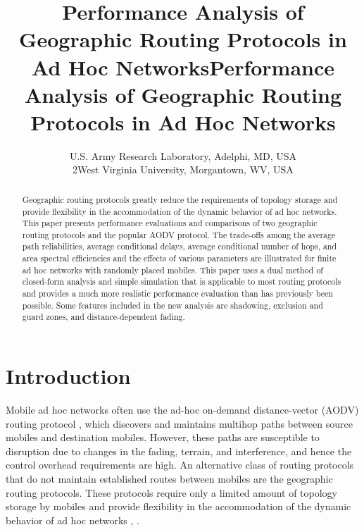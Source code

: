 \documentclass[conference]{IEEEtran}
\begin{document}
\title{Performance Analysis of Geographic Routing Protocols in Ad Hoc Networks}


\title
{Performance Analysis of Geographic Routing Protocols in Ad Hoc Networks}
\author{ \IEEEauthorblockA
{U.S. Army Research Laboratory, Adelphi, MD, USA \\ \IEEEauthorrefmark
{2}West Virginia University, Morgantown, WV, USA} }
\maketitle

\begin{abstract}

Geographic routing protocols greatly reduce
the requirements of topology storage and provide flexibility
in the accommodation of the dynamic behavior of ad hoc
networks. This paper presents performance evaluations and
comparisons of two geographic routing protocols and the
popular AODV protocol. The trade-offs among the average
path reliabilities, average conditional delays, average conditional number of hops, and area spectral efficiencies and the
effects of various parameters are illustrated for finite ad hoc
networks with randomly placed mobiles. This paper uses a
dual method of closed-form analysis and simple simulation
that is applicable to most routing protocols and provides
a much more realistic performance evaluation than has
previously been possible. Some features included in the
new analysis are shadowing, exclusion and guard zones,
and distance-dependent fading.

\end{abstract}

\section{Introduction}

Mobile ad hoc networks often use the ad-hoc on-demand distance-vector (AODV)
routing protocol \cite{perk}, which discovers and maintains multihop paths
between source mobiles and destination mobiles. However, these paths are
susceptible to disruption due to changes in the fading, terrain, and
interference, and hence the control overhead requirements are high. An
alternative class of routing protocols that do not maintain established routes
between mobiles are the geographic routing protocols. These protocols require
only a limited amount of topology storage by mobiles and provide flexibility
in the accommodation of the dynamic behavior of ad hoc networks \cite{cad},
\cite{ghaf}.
\end{document}
